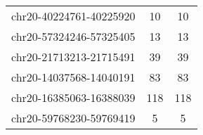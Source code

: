 \begin{longtable}{lSS}
	chr20-40224761-40225920 & 10     & 10                                        \\
	chr20-57324246-57325405 & 13     & 13                                        \\
	chr20-21713213-21715491 & 39     & 39                                        \\
	chr20-14037568-14040191 & 83     & 83                                        \\
	chr20-16385063-16388039 & 118    & 118                                       \\
	chr20-59768230-59769419 & 5      & 5                                         \\
\end{longtable}
